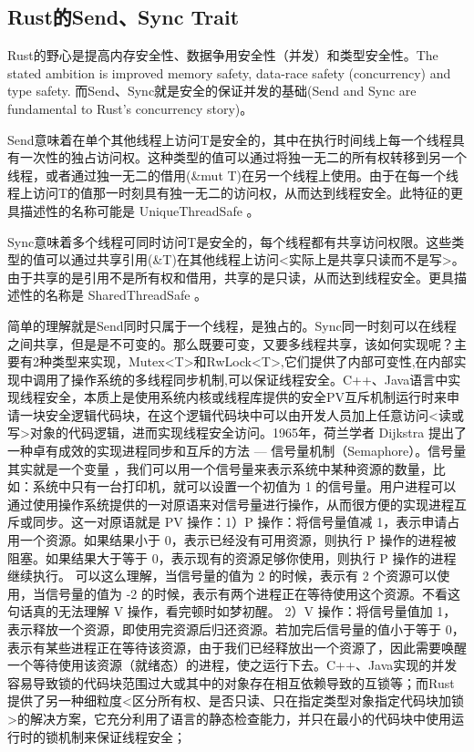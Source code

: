 \documentclass[../../../dolphin-book-2023.tex]{subfiles}
\begin{document}
\subsection{Rust的Send、Sync Trait}

Rust的野心是提高内存安全性、数据争用安全性（并发）和类型安全性。The stated ambition is improved memory safety, data-race safety (concurrency) and type safety. 而Send、Sync就是安全的保证并发的基础(Send and Sync are fundamental to Rust's concurrency story)。

Send意味着在单个其他线程上访问T是安全的，其中在执行时间线上每一个线程具有一次性的独占访问权。这种类型的值可以通过将独一无二的所有权转移到另一个线程，或者通过独一无二的借用(\&mut T)在另一个线程上使用。由于在每一个线程上访问T的值那一时刻具有独一无二的访问权，从而达到线程安全。此特征的更具描述性的名称可能是 UniqueThreadSafe 。

Sync意味着多个线程可同时访问T是安全的，每个线程都有共享访问权限。这些类型的值可以通过共享引用(\&T)在其他线程上访问<实际上是共享只读而不是写>。由于共享的是引用不是所有权和借用，共享的是只读，从而达到线程安全。更具描述性的名称是 SharedThreadSafe 。

简单的理解就是Send同时只属于一个线程，是独占的。Sync同一时刻可以在线程之间共享，但是是不可变的。那么既要可变，又要多线程共享，该如何实现呢？主要有2种类型来实现，Mutex<T>和RwLock<T>,它们提供了内部可变性,在内部实现中调用了操作系统的多线程同步机制,可以保证线程安全。C++、Java语言中实现线程安全，本质上是使用系统内核或线程库提供的安全PV互斥机制运行时来申请一块安全逻辑代码块，在这个逻辑代码块中可以由开发人员加上任意访问<读或写>对象的代码逻辑，进而实现线程安全访问。1965年，荷兰学者 Dijkstra 提出了一种卓有成效的实现进程同步和互斥的方法 — 信号量机制（Semaphore）。信号量其实就是一个变量 ，我们可以用一个信号量来表示系统中某种资源的数量，比如：系统中只有一台打印机，就可以设置一个初值为 1 的信号量。用户进程可以通过使用操作系统提供的一对原语来对信号量进行操作，从而很方便的实现进程互斥或同步。这一对原语就是 PV 操作：1）P 操作：将信号量值减 1，表示申请占用一个资源。如果结果小于 0，表示已经没有可用资源，则执行 P 操作的进程被阻塞。如果结果大于等于 0，表示现有的资源足够你使用，则执行 P 操作的进程继续执行。
可以这么理解，当信号量的值为 2 的时候，表示有 2 个资源可以使用，当信号量的值为 -2 的时候，表示有两个进程正在等待使用这个资源。不看这句话真的无法理解 V 操作，看完顿时如梦初醒。
2）V 操作：将信号量值加 1，表示释放一个资源，即使用完资源后归还资源。若加完后信号量的值小于等于 0，表示有某些进程正在等待该资源，由于我们已经释放出一个资源了，因此需要唤醒一个等待使用该资源（就绪态）的进程，使之运行下去。C++、Java实现的并发容易导致锁的代码块范围过大或其中的对象存在相互依赖导致的互锁等；而Rust提供了另一种细粒度<区分所有权、是否只读、只在指定类型对象指定代码块加锁>的解决方案，它充分利用了语言的静态检查能力，并只在最小的代码块中使用运行时的锁机制来保证线程安全；
\end{document}
